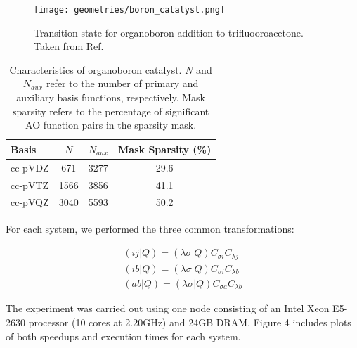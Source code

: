 \begin{figure}[H] 
\centering
\texttt{[image: geometries/boron\_catalyst.png]} \caption{Transition state for organoboron addition to trifluooroacetone. Taken from Ref. \cite{Lec:2016:768}} 
\label{fig:databases} \end{figure}

\begingroup
\begin{table}[H]
\centering
\renewcommand{\baselinestretch}{1}
\caption{Characteristics of organoboron catalyst.
$N$ and $N_{aux}$ refer to the number of primary and auxiliary basis functions, respectively.
Mask sparsity refers to the percentage of significant AO function pairs in the sparsity mask.}
\begin{tabular}{l ccc}
\multicolumn{1}{l}{\textbf{Basis}} &
\multicolumn{1}{c}{\textbf{$N$}} &
\multicolumn{1}{c}{\textbf{$N_{aux}$}} &
\multicolumn{1}{c}{\textbf{Mask Sparsity (\%)}} \\
\hline
cc-pVDZ   & 671  & 3277 & 29.6 \\          
cc-pVTZ   & 1566 & 3856 & 41.1 \\          
cc-pVQZ   & 3040 & 5593 & 50.2 \\          
\end{tabular}
\end{table}
\endgroup


\noindent For each system, we performed the three common transformations:

\begin{align} 
(i j | Q) = (\lambda \sigma | Q) C_{\sigma i} C_{\lambda j} \\
(i b | Q) = (\lambda \sigma | Q) C_{\sigma i} C_{\lambda b} \\
(a b | Q) = (\lambda \sigma | Q) C_{\sigma a} C_{\lambda b} 
\end{align}

\noindent The experiment was carried out using one node consisting of an Intel Xeon E5-2630 processor 
(10 cores at 2.20GHz) and 24GB DRAM. Figure 4 includes plots of both speedups and execution times for each system.

